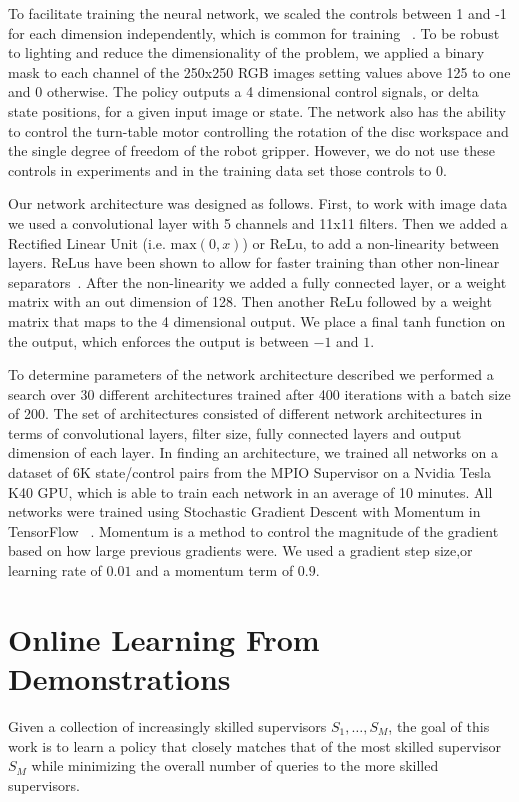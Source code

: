 \documentclass[10pt, conference]{ieeeconf}      %
\begin{document}
To facilitate training the neural network, we scaled the controls  between 1 and -1 for each dimension independently, which is common for training ~\cite{tensorflow2015-whitepaper}. To be robust to lighting and reduce
the dimensionality of the problem, we applied a binary mask to each channel of the 250x250 RGB images setting
values above 125 to one and 0 otherwise.
The policy  outputs a 4 dimensional control signals, or delta state positions, for a given input image or state. The network also has the ability to control the turn-table motor controlling the rotation of the disc workspace and the single degree of freedom of the robot gripper. However, we do not use these controls in experiments and in the training data set those controls to $0$. 

 Our network architecture was designed as follows. First, to work with image data we used a convolutional layer with 5 channels and 11x11 filters. Then we added a Rectified Linear Unit (i.e. $\mbox{max}(0,x)$) or ReLu,  to add a non-linearity between layers. ReLus have been shown to allow for faster training than other non-linear separators~\cite{krizhevsky2012imagenet}. After the non-linearity we added a fully connected layer, or a weight matrix with an out dimension of 128. Then  another ReLu  followed by a weight matrix that maps to the 4 dimensional output. We place a final $\mbox{tanh}$ function on the output, which  enforces the output is between $-1$ and $1$.
 
To determine parameters of the network architecture described we performed a search over 30 different architectures trained after 400 iterations
with a batch size of 200. The set of architectures consisted of different network architectures in terms of
convolutional layers, filter size,  fully connected layers and output dimension of each layer. In finding an architecture, we trained all networks on a dataset of 6K state/control pairs from the MPIO Supervisor on a Nvidia Tesla K40 GPU, which is able to train each network in an average of 10 minutes.  All networks were trained using Stochastic Gradient Descent with Momentum in TensorFlow ~\cite{tensorflow2015-whitepaper}. Momentum is a method to control the magnitude of the gradient based on how large previous gradients were. We used a gradient step size,or learning rate of $0.01$ and a momentum term of $0.9$. 



\section{Online Learning From Demonstrations}\label{sec:PS}
Given a collection of increasingly skilled supervisors $S_1, \ldots, S_M$, the goal of this work is to learn a
policy that closely matches that of the most skilled supervisor $S_M$ while minimizing the overall number of queries to the more skilled supervisors. 
\end{document}
